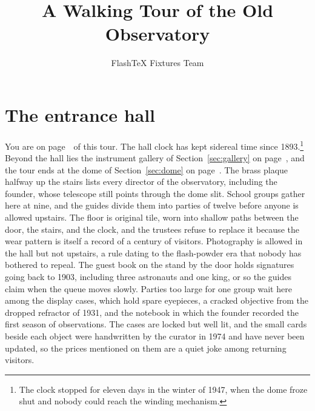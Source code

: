 \documentclass[11pt]{article}
\title{A Walking Tour of the Old Observatory}
\author{FlashTeX Fixtures Team}
\date{}
\begin{document}
\maketitle
\section{The entrance hall}
\label{sec:hall}
You are on page~\thepage\ of this tour. The hall clock has kept sidereal time since 1893.\footnote{The clock stopped for eleven days in the winter of 1947, when the dome froze shut and nobody could reach the winding mechanism.} Beyond the hall lies the instrument gallery of Section~\ref{sec:gallery} on page~\pageref{sec:gallery}, and the tour ends at the dome of Section~\ref{sec:dome} on page~\pageref{sec:dome}. The brass plaque halfway up the stairs lists every director of the observatory, including the founder, whose telescope still points through the dome slit. School groups gather here at nine, and the guides divide them into parties of twelve before anyone is allowed upstairs. The floor is original tile, worn into shallow paths between the door, the stairs, and the clock, and the trustees refuse to replace it because the wear pattern is itself a record of a century of visitors. Photography is allowed in the hall but not upstairs, a rule dating to the flash-powder era that nobody has bothered to repeal. The guest book on the stand by the door holds signatures going back to 1903, including three astronauts and one king, or so the guides claim when the queue moves slowly. Parties too large for one group wait here among the display cases, which hold spare eyepieces, a cracked objective from the dropped refractor of 1931, and the notebook in which the founder recorded the first season of observations. The cases are locked but well lit, and the small cards beside each object were handwritten by the curator in 1974 and have never been updated, so the prices mentioned on them are a quiet joke among returning visitors.
\end{document}
